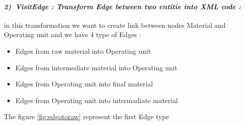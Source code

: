 \paragraph{\emph{2)~VisitEdge : Transform Edge between two entitie into XML code :} } in this transformation 
we want to create link between nodes Material and Operating unit 
and we have 4 type of Edges : 
\begin{itemize}

\newcommand{\localtextbulletone}{\textcolor{gray}{\raisebox{.45ex}{\rule{.6ex}{.6ex}}}}
\renewcommand{\labelitemi}{\localtextbulletone}
	\item Edges from raw material into Operating unit
	\item Edges from intermediate material into Operating unit
	
	\item Edges from Operating unit into final material
	\item Edges from Operating unit into intermadiate material 
\end{itemize}
The figure \ref{fig:edgotoraw} represent the first Edge type 
\vspace{1cm}
